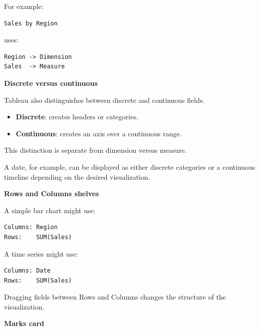 \documentclass[11pt,letterpaper]{article}
\begin{document}
For example:

\begin{lstlisting}
Sales by Region
\end{lstlisting}

uses:

\begin{lstlisting}
Region -> Dimension
Sales  -> Measure
\end{lstlisting}



\textbf{Discrete versus continuous}

Tableau also distinguishes between discrete and continuous fields.

\begin{itemize}[leftmargin=*]
    \item \textbf{Discrete}: creates headers or categories.
    \item \textbf{Continuous}: creates an axis over a continuous range.
\end{itemize}

This distinction is separate from dimension versus measure.

A date, for example, can be displayed as either discrete categories or a
continuous timeline depending on the desired visualization.



\textbf{Rows and Columns shelves}

A simple bar chart might use:

\begin{lstlisting}
Columns: Region
Rows:    SUM(Sales)
\end{lstlisting}

A time series might use:

\begin{lstlisting}
Columns: Date
Rows:    SUM(Sales)
\end{lstlisting}

Dragging fields between Rows and Columns changes the structure of the
visualization.



\textbf{Marks card}
\end{document}
